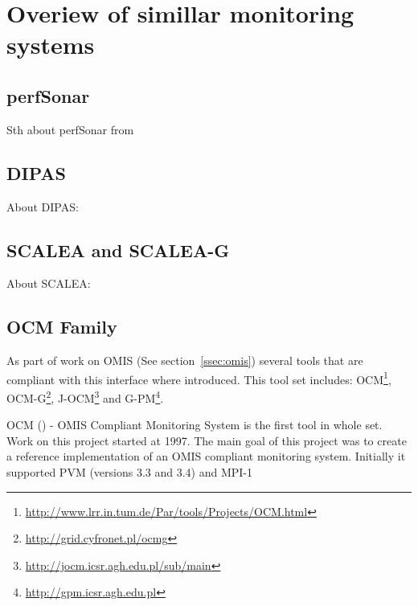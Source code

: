 %
 
 
\section{Overiew of simillar monitoring systems}
\label{sec:ch2_similar}


\subsection{perfSonar}

Sth about perfSonar from\cite{perfSonar1,perfSonar2,perfSonar3}


\subsection{DIPAS}

About DIPAS: \cite{DIPAS}

\subsection{SCALEA and SCALEA-G}

About SCALEA: \cite{SCALEA1,SCALEA2, SCALEA3}

\subsection{OCM Family}

As part of work on OMIS (See section~\ref{ssec:omis}) several tools that are compliant with this interface where introduced. This tool set includes: OCM\footnote{\url{http://www.lrr.in.tum.de/Par/tools/Projects/OCM.html}}, OCM-G\footnote{\url{http://grid.cyfronet.pl/ocmg}}, J-OCM\footnote{\url{http://jocm.icsr.agh.edu.pl/sub/main}} and G-PM\footnote{\url{http://gpm.icsr.agh.edu.pl}}.

OCM (\cite{RWspdt98, RW:ppam99b}) - OMIS Compliant Monitoring System is the first tool in whole set. Work on this project started at 1997. The main goal of this project was to create a reference implementation of an OMIS compliant monitoring system. Initially it supported PVM (versions 3.3 and 3.4) and MPI-1

